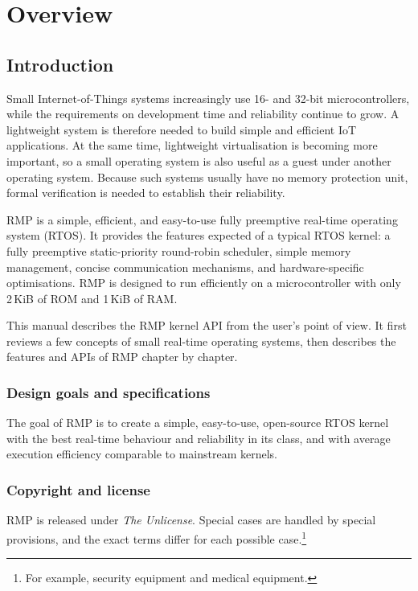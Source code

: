 \chapter{Overview}\label{ch:introduction}

\section{Introduction}

Small Internet-of-Things systems increasingly use 16- and 32-bit microcontrollers, while the requirements on development time and reliability continue to grow.
A lightweight system is therefore needed to build simple and efficient IoT applications.
At the same time, lightweight virtualisation is becoming more important, so a small operating system is also useful as a guest under another operating system.
Because such systems usually have no memory protection unit, formal verification is needed to establish their reliability.

RMP is a simple, efficient, and easy-to-use fully preemptive real-time operating system (RTOS).
It provides the features expected of a typical RTOS kernel: a fully preemptive static-priority round-robin scheduler, simple memory management, concise communication mechanisms, and hardware-specific optimisations.
RMP is designed to run efficiently on a microcontroller with only 2\,KiB of ROM and 1\,KiB of RAM.

This manual describes the RMP kernel API from the user's point of view.
It first reviews a few concepts of small real-time operating systems, then describes the features and APIs of RMP chapter by chapter.

\subsection{Design goals and specifications}

The goal of RMP is to create a simple, easy-to-use, open-source RTOS kernel with the best real-time behaviour and reliability in its class, and with average execution efficiency comparable to mainstream kernels.

\subsection{Copyright and license}

RMP is released under \emph{The Unlicense}.
Special cases are handled by special provisions, and the exact terms differ for each possible case.\footnote{For example, security equipment and medical equipment.}

